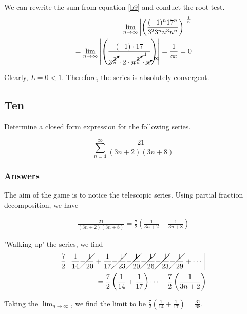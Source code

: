 \documentclass{article}
\begin{document}
We can rewrite the sum from equation \ref{b9} and conduct the root test.
\begin{align*}
\lim_{n\to\infty} \left|\left(\frac{(-1)^n 17^n}{3^2 3^n n^3 n^n}\right)\right|^{\frac{1}{n}}\\
= \lim_{n\to\infty} \left|\left(\frac{(-1) \cdot 17}{\cancelto{1}{3^{\frac{2}{n}}} \cdot 2 \cdot \cancelto{1}{n^{\frac{3}{n}}} \cdot \cancelto{\infty}{n}} \right) \right| = \frac{1}{\infty} = 0
\end{align*}

Clearly, $L = 0 < 1$. Therefore, the series is absolutely convergent.

\par

\subsection*{Ten}

Determine a closed form expression for the following series.

\begin{equation}\label{b10}
\sum_{n=4}^{\infty} \frac{21}{(3n+2)(3n+8)}
\end{equation}
\subsubsection*{Answers}

The aim of the game is to notice the telescopic series. Using partial fraction decomposition, we have

\begin{align*}
\frac{21}{(3n+2)(3n+8)} = \frac{7}{2}\left(\frac{1}{3n+2}-\frac{1}{3n+8}\right)
\end{align*}

'Walking up' the series, we find
\begin{align*}
\frac{7}{2}\left[\frac{1}{14} \cancel{- \frac{1}{20}} + \frac{1}{17} \cancel{- \frac{1}{23}} \cancel{+ \frac{1}{20}} \cancel{- \frac{1}{26}} \cancel{+ \frac{1}{23}} \cancel{- \frac{1}{29}} + \cdots \right]\\
= \frac{7}{2}\left(\frac{1}{14}+\frac{1}{17}\right) \cdots - \frac{7}{2}\left(\frac{1}{3n+2}\right)
\end{align*}

Taking the $\lim_{n\to\infty}$, we find the limit to be $ \frac{7}{2}\left(\frac{1}{14}+\frac{1}{17}\right) = \frac{31}{68}$.
\par
\end{document}
